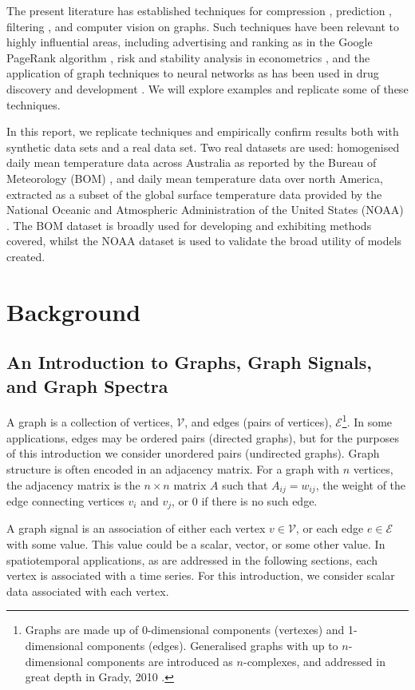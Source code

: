 \documentclass[12pt,a4paper]{article} %
\begin{document}
The present literature has established techniques for compression \cite{moura}, prediction \cite{krige}, filtering \cite{taubin}, and computer vision \cite{grady_shah} on graphs. Such techniques have been relevant to highly influential areas, including advertising and ranking as in the Google PageRank algorithm \cite{page}, risk and stability analysis in econometrics \cite{acemoglu}, and the application of graph techniques to neural networks as has been used in drug discovery and development \cite{sun}. We will explore examples and replicate some of these techniques.

In this report, we replicate techniques and empirically confirm results both with synthetic data sets and a real data set. Two real datasets are used: homogenised daily mean temperature data across Australia as reported by the Bureau of Meteorology (BOM) \cite{bom}, and daily mean temperature data over north America, extracted as a subset of the global surface temperature data provided by the National Oceanic and Atmospheric Administration of the United States (NOAA) \cite{noaa}. The BOM dataset is broadly used for developing and exhibiting methods covered, whilst the NOAA dataset is used to validate the broad utility of models created.

\newpage
\section{Background}\subsection{An Introduction to Graphs, Graph Signals, and Graph Spectra}
\label{subsec:graph_intro}
A graph is a collection of vertices, $\mathcal{V}$, and edges (pairs of vertices), $\mathcal{E}$\footnote{Graphs are made up of 0-dimensional components (vertexes) and 1-dimensional components (edges). Generalised graphs with up to $n$-dimensional components are introduced as $n$-complexes, and addressed in great depth in Grady, 2010 \cite{grady}.}. In some applications, edges may be ordered pairs (directed graphs), but for the purposes of this introduction we consider unordered pairs (undirected graphs). Graph structure is often encoded in an adjacency matrix. For a graph with $n$ vertices, the adjacency matrix is the $n\times n$ matrix $A$ such that $A_{ij}=w_{ij}$, the weight of the edge connecting vertices $v_i$ and $v_j$, or $0$ if there is no such edge.

A graph signal is an association of either each vertex $v\in\mathcal{V}$, or each edge $e\in\mathcal{E}$ with some value. This value could be a scalar, vector, or some other value. In spatiotemporal applications, as are addressed in the following sections, each vertex is associated with a time series. For this introduction, we consider scalar data associated with each vertex.
\end{document}
